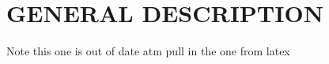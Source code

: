 \documentclass{datasheet}
\begin{document}
\section{GENERAL DESCRIPTION}

Note this one is out of date atm
pull in the one from latex
\end{document}

